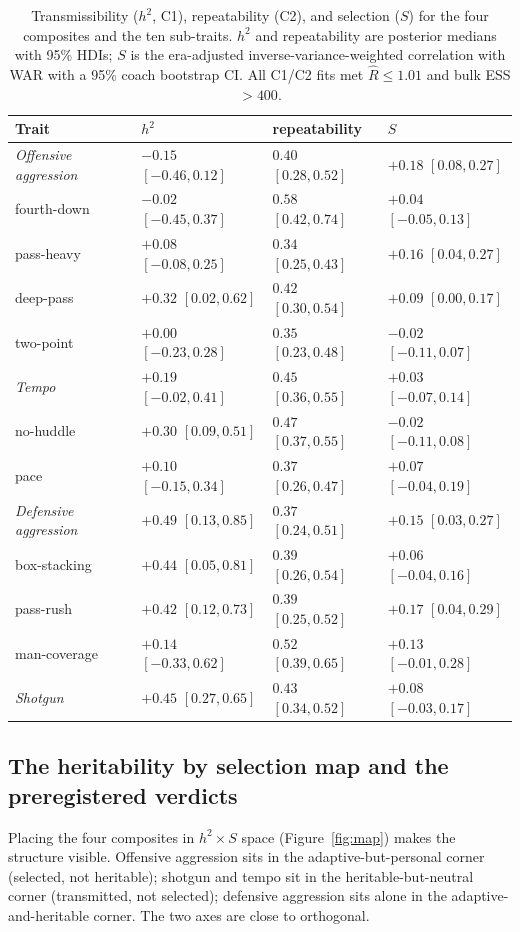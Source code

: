 \documentclass[11pt]{article}
\begin{document}
\begin{table}[t]
\centering
\caption{Transmissibility ($h^{2}$, C1), repeatability (C2), and selection ($S$)
for the four composites and the ten sub-traits. $h^{2}$ and repeatability are
posterior medians with 95\% HDIs; $S$ is the era-adjusted inverse-variance-weighted
correlation with WAR with a 95\% coach bootstrap CI. All C1/C2 fits met
$\hat{R}\le1.01$ and bulk ESS $>400$.}
\label{tab:main}
\begin{tabular}{llll}
\toprule
Trait & $h^{2}$ & repeatability & $S$ \\
\midrule
\textit{Offensive aggression} & $-0.15$ $[-0.46,0.12]$ & $0.40$ $[0.28,0.52]$ & $+0.18$ $[0.08,0.27]$ \\
\quad fourth-down   & $-0.02$ $[-0.45,0.37]$ & $0.58$ $[0.42,0.74]$ & $+0.04$ $[-0.05,0.13]$ \\
\quad pass-heavy    & $+0.08$ $[-0.08,0.25]$ & $0.34$ $[0.25,0.43]$ & $+0.16$ $[0.04,0.27]$ \\
\quad deep-pass     & $+0.32$ $[0.02,0.62]$  & $0.42$ $[0.30,0.54]$ & $+0.09$ $[0.00,0.17]$ \\
\quad two-point     & $+0.00$ $[-0.23,0.28]$ & $0.35$ $[0.23,0.48]$ & $-0.02$ $[-0.11,0.07]$ \\
\textit{Tempo}      & $+0.19$ $[-0.02,0.41]$ & $0.45$ $[0.36,0.55]$ & $+0.03$ $[-0.07,0.14]$ \\
\quad no-huddle     & $+0.30$ $[0.09,0.51]$  & $0.47$ $[0.37,0.55]$ & $-0.02$ $[-0.11,0.08]$ \\
\quad pace          & $+0.10$ $[-0.15,0.34]$ & $0.37$ $[0.26,0.47]$ & $+0.07$ $[-0.04,0.19]$ \\
\textit{Defensive aggression} & $+0.49$ $[0.13,0.85]$ & $0.37$ $[0.24,0.51]$ & $+0.15$ $[0.03,0.27]$ \\
\quad box-stacking  & $+0.44$ $[0.05,0.81]$  & $0.39$ $[0.26,0.54]$ & $+0.06$ $[-0.04,0.16]$ \\
\quad pass-rush     & $+0.42$ $[0.12,0.73]$  & $0.39$ $[0.25,0.52]$ & $+0.17$ $[0.04,0.29]$ \\
\quad man-coverage  & $+0.14$ $[-0.33,0.62]$ & $0.52$ $[0.39,0.65]$ & $+0.13$ $[-0.01,0.28]$ \\
\textit{Shotgun}    & $+0.45$ $[0.27,0.65]$  & $0.43$ $[0.34,0.52]$ & $+0.08$ $[-0.03,0.17]$ \\
\bottomrule
\end{tabular}
\end{table}

\subsection{The heritability by selection map and the preregistered verdicts}
Placing the four composites in $h^{2}\times S$ space (Figure~\ref{fig:map}) makes
the structure visible. Offensive aggression sits in the adaptive-but-personal
corner (selected, not heritable); shotgun and tempo sit in the heritable-but-neutral
corner (transmitted, not selected); defensive aggression sits alone in the
adaptive-and-heritable corner. The two axes are close to orthogonal.
\end{document}

